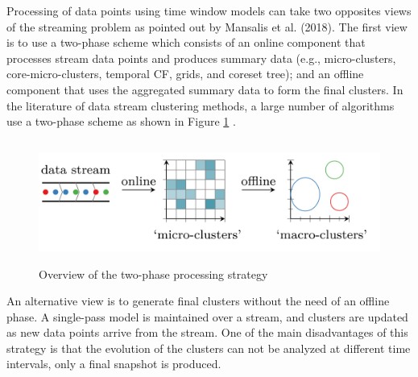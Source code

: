 



Processing of data points using time window models can take two opposites views of the streaming problem as pointed out by Mansalis et al. (2018). The first view is to use a two-phase scheme which consists of an online component that processes stream data points and produces summary data  (e.g., micro-clusters, core-micro-clusters, temporal CF, grids, and coreset tree); and an offline component that uses the aggregated summary data to form the final clusters. In the literature of data stream clustering methods, a large number of algorithms use a two-phase scheme as shown in Figure \ref{2phase} . 

\begin{figure}[t]
\centering
\includegraphics[width = 15cm,height = 4cm]{image/Chapters/Chapter2/2phase.png}
\caption{Overview of the two-phase processing strategy \protect\cite{carnein2019optimizing}}
\label{2phase}
\end{figure}

An alternative view is to generate final clusters without the need of an offline phase. A single-pass model is maintained over a stream, and clusters are updated as new data points arrive from the stream. One of the main disadvantages of this strategy is that the evolution of the clusters can not be analyzed at different time intervals, only a final snapshot is produced.     

